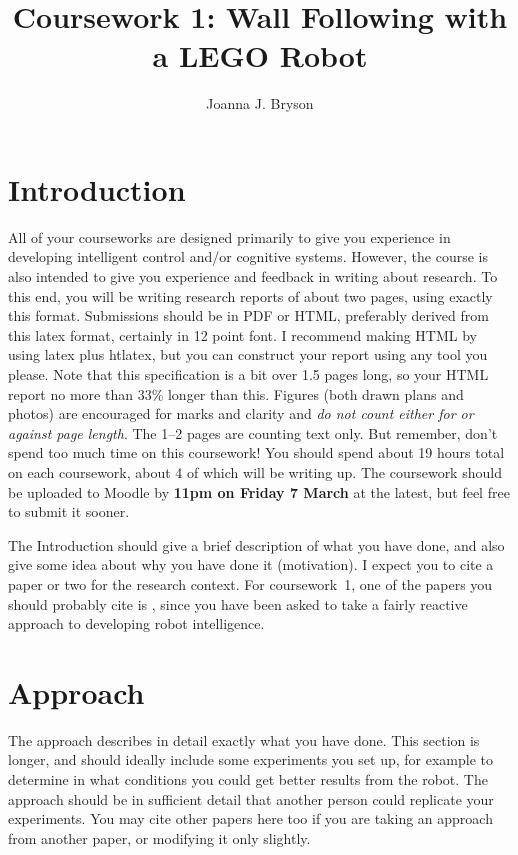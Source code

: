 \documentclass[a4paper,12pt]{article}
\title{Coursework 1:  Wall Following with a LEGO Robot}
\author{Joanna J. Bryson}
\begin{document}
\maketitle

\section{Introduction}
All of your courseworks are designed primarily to give you experience
in developing intelligent control and/or cognitive systems.  However,
the course is also intended to give you experience and feedback in
writing about research.  To this end, you will be writing research
reports of about two pages, using exactly this format.  Submissions
should be in PDF or HTML, preferably derived from this latex format,
certainly in 12 point font.  I recommend making HTML by using latex
plus htlatex, but you can construct your report using any tool you
please.  Note that this specification is a bit over 1.5 pages long, so
your HTML report no more than 33\% longer than this.  Figures (both
drawn plans and photos) are encouraged for marks and clarity and {\em
  do not count either for or against page length}.  The 1--2 pages are
counting text only.  But remember, don't spend too much time on this
coursework!  You should spend about 19 hours total on each coursework,
about 4 of which will be writing up.  The coursework should be
uploaded to Moodle by {\bf 11pm on Friday 7 March} at the latest, but
feel free to submit it sooner.

The Introduction should give a brief description of what you have
done, and also give some idea about why you have done it (motivation).
I expect you to cite a paper or two for the research context.  For
coursework~1, one of the papers you should probably cite is
\citet{BrooksAIJ91}, since you have been asked to take a fairly
reactive approach to developing robot intelligence.

\section{Approach}

The approach describes in detail exactly what you have done.  This
section is longer, and should ideally include some experiments you set
up, for example to determine in what conditions you could get better
results from the robot.  The approach should be in sufficient detail
that another person could replicate your experiments.  You may cite
other papers here too if you are taking an approach from another
paper, or modifying it only slightly.
\end{document}

